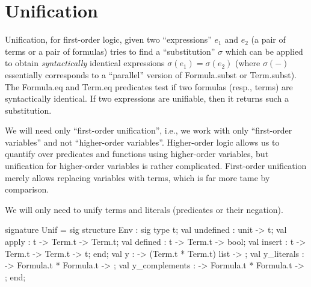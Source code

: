 
\section{Unification}


\begin{node}
Unification, for first-order logic, given two ``expressions'' $e_{1}$
and $e_{2}$ (a pair of terms or a pair of formulas) tries to find a
``substitution'' $\sigma$ which can be applied to obtain
\emph{syntactically} identical expressions
$\sigma(e_{1})=\sigma(e_{2})$ (where $\sigma(-)$ essentially
corresponds to a ``parallel'' version of {\Tt{}Formula.subst\nwendquote} or {\Tt{}Term.subst\nwendquote}). The {\Tt{}Formula.eq\nwendquote} and {\Tt{}Term.eq\nwendquote}
predicates test if two formulas (resp., terms) are syntactically
identical. If two expressions are unifiable, then it returns such a
substitution. 

We will need only ``first-order unification'', i.e., we work with only
``first-order variables'' and not ``higher-order
variables''. Higher-order logic allows us to quantify over predicates
and functions using higher-order variables, but unification for
higher-order variables is rather complicated. First-order unification
merely allows replacing variables with terms, which is far more tame
by comparison.

We will only need to unify terms and literals (predicates or their
negation). 
\end{node}

\nwenddocs{}\endmoddef\nwstartdeflinemarkup\nwenddeflinemarkup
signature Unif = sig
  structure Env :
            sig
              type t;
              val undefined : unit -> t;
              val apply : t -> Term.t -> Term.t;
              val defined : t -> Term.t -> bool;
              val insert : t -> Term.t -> Term.t -> t;
            end;
  val y :  -> (Term.t * Term.t) list -> ;
  val y_literals :  -> Formula.t * Formula.t -> ;
  val y_complements :  -> Formula.t * Formula.t -> ;
end;
\nwendcode{}\nwdocspar

